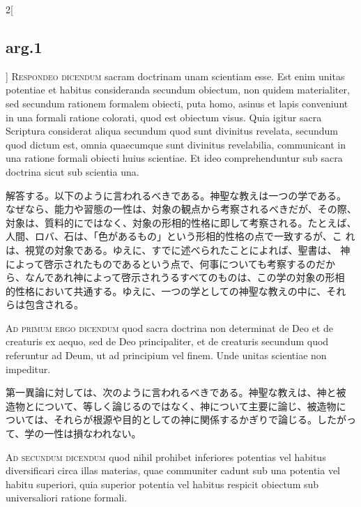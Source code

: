 \documentclass[
paper=a4paper,
fontsize=10pt,
jafontsize=9pt,
titlepage
]{jlreq}
\begin{document}
\begin{paracol}{2}[\subsection{arg.1}]
{\scshape Respondeo dicendum} sacram doctrinam unam scientiam
esse. Est enim unitas potentiae et habitus consideranda secundum
obiectum, non quidem materialiter, sed secundum rationem formalem
obiecti, puta homo, asinus et lapis conveniunt in una formali ratione
colorati, quod est obiectum visus. Quia igitur sacra Scriptura
considerat aliqua secundum quod sunt divinitus revelata, secundum quod
dictum est, omnia quaecumque sunt divinitus revelabilia, communicant
in una ratione formali obiecti huius scientiae. Et ideo
comprehenduntur sub sacra doctrina sicut sub scientia una.

\switchcolumn

解答する。以下のように言われるべきである。神聖な教えは一つの学である。
なぜなら、能力や習態の一性は、対象の観点から考察されるべきだが、その際、
対象は、質料的にではなく、対象の形相的性格に即して考察される。たとえば、
人間、ロバ、石は、「色があるもの」という形相的性格の点で一致するが、こ
れは、視覚の対象である。ゆえに、すでに述べられたことによれば、聖書は、
神によって啓示されたものであるという点で、何事についても考察するのだか
ら、なんであれ神によって啓示されうるすべてのものは、この学の対象の形相
的性格において共通する。ゆえに、一つの学としての神聖な教えの中に、それ
らは包含される。

\switchcolumn*[\subsection{ad.1}]

{\scshape Ad primum ergo dicendum} quod sacra doctrina non determinat
de Deo et de creaturis ex aequo, sed de Deo principaliter, et de
creaturis secundum quod referuntur ad Deum, ut ad principium vel
finem. Unde unitas scientiae non impeditur.

\switchcolumn

第一異論に対しては、次のように言われるべきである。神聖な教えは、神と被
造物とについて、等しく論じるのではなく、神について主要に論じ、被造物に
ついては、それらが根源や目的としての神に関係するかぎりで論じる。したがっ
て、学の一性は損なわれない。

\switchcolumn*[\subsection{ad.2}]

{\scshape Ad secundum dicendum} quod nihil prohibet inferiores
potentias vel habitus diversificari circa illas materias, quae
communiter cadunt sub una potentia vel habitu superiori, quia superior
potentia vel habitus respicit obiectum sub universaliori ratione
formali.


\end{paracol}
\end{document}
